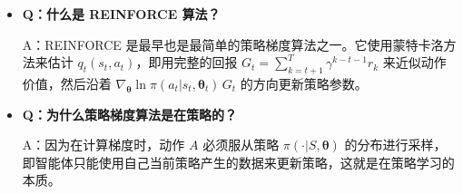 \documentclass[UTF8]{article}
\begin{document}
\begin{itemize}
    \item \textbf{Q：什么是 REINFORCE 算法？}

    A：REINFORCE 是最早也是最简单的策略梯度算法之一。它使用蒙特卡洛方法来估计 $q_t(s_t, a_t)$，即用完整的回报 $G_t = \sum_{k=t+1}^{T} \gamma^{k-t-1} r_k$ 来近似动作价值，然后沿着 $\nabla_{\boldsymbol{\theta}} \ln \pi(a_t|s_t, \boldsymbol{\theta}_t) \, G_t$ 的方向更新策略参数。

    \item \textbf{Q：为什么策略梯度算法是在策略的？}

    A：因为在计算梯度时，动作 $A$ 必须服从策略 $\pi(\cdot|S, \boldsymbol{\theta})$ 的分布进行采样，即智能体只能使用自己当前策略产生的数据来更新策略，这就是在策略学习的本质。
\end{itemize}
\end{document}
